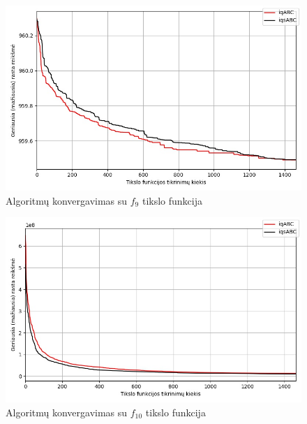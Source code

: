 \documentclass{VUMIFKompMagistrinis}
\begin{document}
\begin{landscape}
\begin{multicols}{2}
\begin{figure}[H]
    \centering
    \includegraphics[scale=0.5]{img/2kg/f9.jpg}
    \caption{Algoritmų konvergavimas su $f_{9}$ tikslo funkcija}
    \label{img:vkonf9}
\end{figure}


\begin{figure}[H]
    \centering
    \includegraphics[scale=0.5]{img/2kg/f10.jpg}
    \caption{Algoritmų konvergavimas su $f_{10}$ tikslo funkcija}
    \label{img:vkonf10}
\end{figure}




\end{multicols}\newpage
\begin{multicols}{2}



\end{multicols}
\end{landscape}
\end{document}
